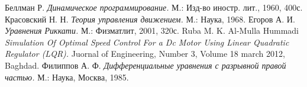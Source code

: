  Беллман Р. \textit{Динамическое программирование.} М.: Изд-во иностр. лит., 1960, 400с.
 Красовский Н. Н. \textit{Теория управления движением.} М.: Наука, 1968.
 Егоров А. И. \textit{Уравнения Риккати.} М.: Физматлит, 2001, 320с.
 Ruba M. K. Al-Mulla Hummadi \textit{Simulation Of Optimal Speed Control For a Dc Motor Using Linear Quadratic Regulator (LQR).} Juornal of Engineering, Number 3, Volume 18 march 2012, Baghdad.
 Филиппов А. Ф. \textit{Дифференциальные уравнения с разрывной правой частью.} М.: Наука, Москва, 1985.